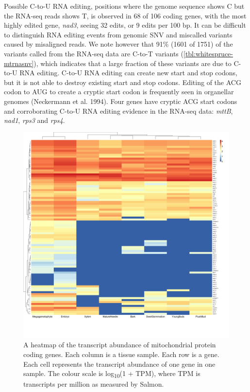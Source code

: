 \documentclass[
  12pt,
  oneside,
  openany]{book}
\begin{document}
Possible C-to-U RNA editing, positions where the genome sequence shows C but the RNA-seq reads shows T, is observed in 68 of 106 coding genes, with the most highly edited gene, \emph{nad3}, seeing 32 edits, or 9 edits per 100 bp. It can be difficult to distinguish RNA editing events from genomic SNV and miscalled variants caused by misaligned reads. We note however that 91\% (1601 of 1751) of the variants called from the RNA-seq data are C-to-T variants (\cref{tbl:whitespruce-mtrnasnv}), which indicates that a large fraction of these variants are due to C-to-U RNA editing. C-to-U RNA editing can create new start and stop codons, but it is not able to destroy existing start and stop codons. Editing of the ACG codon to AUG to create a cryptic start codon is frequently seen in organellar genomes (Neckermann et al. 1994). Four genes have cryptic ACG start codons and corroborating C-to-U RNA editing evidence in the RNA-seq data: \emph{mttB}, \emph{nad1}, \emph{rps3} and \emph{rps4}.

\begin{figure}
\hypertarget{fig:mtheatmap}{%
\centering
\includegraphics{whitespruce/mt-cds-heatmap.png}
\caption[A heatmap of the transcript abundance of mitochondrial protein coding genes.]{A heatmap of the transcript abundance of mitochondrial protein coding genes. Each column is a tissue sample. Each row is a gene. Each cell represents the transcript abundance of one gene in one sample. The colour scale is log\textsubscript{10}(1 + TPM), where TPM is transcripts per million as measured by Salmon.}\label{fig:mtheatmap}
}
\end{figure}
\end{document}

